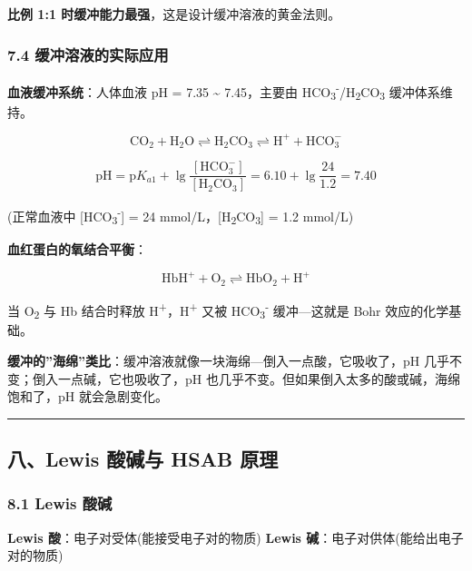 \documentclass[a4paper,11pt]{ctexart}
\begin{document}
\textbf{比例 1:1 时缓冲能力最强}，这是设计缓冲溶液的黄金法则。

\subsubsection{7.4 缓冲溶液的实际应用}\label{ux7f13ux51b2ux6eb6ux6db2ux7684ux5b9eux9645ux5e94ux7528}

\textbf{血液缓冲系统}：人体血液 pH = 7.35 \textasciitilde{} 7.45，主要由 HCO\textsubscript{3}\textsuperscript{-}/H\textsubscript{2}CO\textsubscript{3} 缓冲体系维持。

\[
\mathrm{CO_2 + H_2O \rightleftharpoons H_2CO_3 \rightleftharpoons H^+ + HCO_3^-}
\]

\[
\mathrm{pH} = \mathrm{p}K_{a1} + \lg\frac{[\mathrm{HCO_3^-}]}{[\mathrm{H_2CO_3}]} = 6.10 + \lg\frac{24}{1.2} = 7.40
\]

(正常血液中 {[}HCO\textsubscript{3}\textsuperscript{-}{]} = 24 mmol/L，{[}H\textsubscript{2}CO\textsubscript{3}{]} = 1.2 mmol/L)

\textbf{血红蛋白的氧结合平衡}：

\[
\mathrm{HbH^+ + O_2 \rightleftharpoons HbO_2 + H^+}
\]

当 O\textsubscript{2} 与 Hb 结合时释放 H\textsuperscript{+}，H\textsuperscript{+} 又被 HCO\textsubscript{3}\textsuperscript{-} 缓冲---这就是 Bohr 效应的化学基础。

\textbf{缓冲的''海绵''类比}：缓冲溶液就像一块海绵---倒入一点酸，它吸收了，pH 几乎不变；倒入一点碱，它也吸收了，pH 也几乎不变。但如果倒入太多的酸或碱，海绵饱和了，pH 就会急剧变化。

\begin{center}\rule{0.5\linewidth}{0.5pt}\end{center}

\subsection{八、Lewis 酸碱与 HSAB 原理}\label{ux516blewis-ux9178ux78b1ux4e0e-hsab-ux539fux7406}

\subsubsection{8.1 Lewis 酸碱}\label{lewis-ux9178ux78b1}

\textbf{Lewis 酸}：电子对受体(能接受电子对的物质)
\textbf{Lewis 碱}：电子对供体(能给出电子对的物质)
\end{document}
